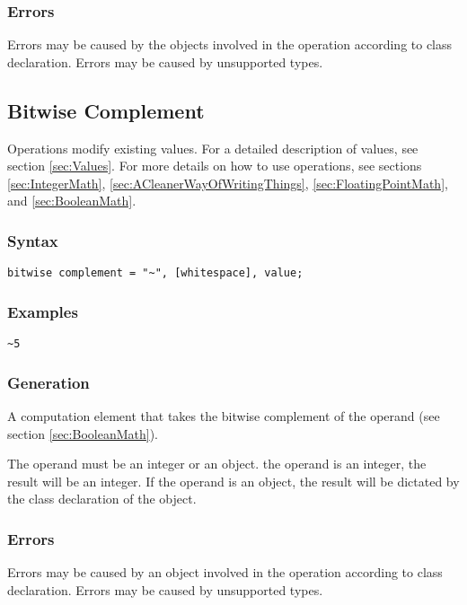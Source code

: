 \documentclass[10pt,a4paper]{article}
\begin{document}
\subsubsection{Errors}
Errors may be caused by the objects involved in the operation according to class declaration. Errors may be caused by unsupported types.

\newpage




\subsection{Bitwise Complement}
Operations modify existing values. For a detailed description of values, see section \ref{sec:Values}. For more details on how to use operations, see sections \ref{sec:IntegerMath}, \ref{sec:ACleanerWayOfWritingThings}, \ref{sec:FloatingPointMath}, and \ref{sec:BooleanMath}.

\subsubsection{Syntax}
\begin{verbatim}
bitwise complement = "~", [whitespace], value;
\end{verbatim}

\subsubsection{Examples}
\begin{verbatim}
~5
\end{verbatim}

\subsubsection{Generation}
A computation element that takes the bitwise complement of the operand (see section \ref{sec:BooleanMath}).

The operand must be an integer or an object. the operand is an integer, the result will be an integer. If the operand is an object, the result will be dictated by the class declaration of the object.

\subsubsection{Errors}
Errors may be caused by an object involved in the operation according to class declaration. Errors may be caused by unsupported types.
\end{document}
